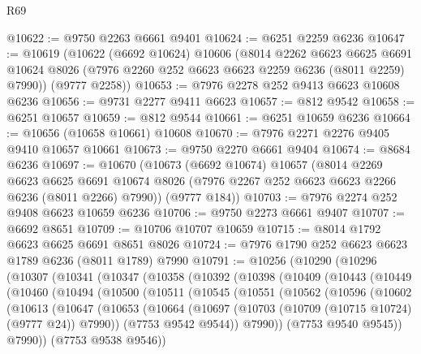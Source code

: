 \begin{lexlean}{R69}
\begin{coremodule}
{@10622 := @9750 @2263 @6661 @9401
@10624 := @6251 @2259 @6236
@10647 := @10619
    (@10622
      (@6692 @10624)
      @10606
      (@8014
        @2262
        @6623
        @6625
        @6691
        @10624
        @8026
        (@7976 @2260 @252 @6623 @6623 @2259 @6236 (@8011 @2259) @7990))
      (@9777 @2258))
@10653 := @7976 @2278 @252 @9413 @6623 @10608 @6236
@10656 := @9731 @2277 @9411 @6623
@10657 := @812 @9542
@10658 := @6251 @10657
@10659 := @812 @9544
@10661 := @6251 @10659 @6236
@10664 := @10656 (@10658 @10661) @10608
@10670 := @7976 @2271 @2276 @9405 @9410 @10657 @10661
@10673 := @9750 @2270 @6661 @9404
@10674 := @8684 @6236
@10697 := @10670
    (@10673
      (@6692 @10674)
      @10657
      (@8014
        @2269
        @6623
        @6625
        @6691
        @10674
        @8026
        (@7976 @2267 @252 @6623 @6623 @2266 @6236 (@8011 @2266) @7990))
      (@9777 @184))
@10703 := @7976 @2274 @252 @9408 @6623 @10659 @6236
@10706 := @9750 @2273 @6661 @9407
@10707 := @6692 @8651
@10709 := @10706 @10707 @10659
@10715 := @8014 @1792 @6623 @6625 @6691 @8651 @8026
@10724 := @7976 @1790 @252 @6623 @6623 @1789 @6236 (@8011 @1789) @7990
@10791 := @10256
    (@10290
      (@10296
        (@10307
          (@10341
            (@10347
              (@10358
                (@10392
                  (@10398
                    (@10409
                      (@10443
                        (@10449
                          (@10460
                            (@10494
                              (@10500
                                (@10511
                                  (@10545
                                    (@10551
                                      (@10562
                                        (@10596
                                          (@10602
                                            (@10613
                                              (@10647
                                                (@10653
                                                  (@10664
                                                    (@10697
                                                      (@10703
                                                        (@10709 (@10715 @10724) (@9777 @24))
                                                        @7990))
                                                    (@7753 @9542 @9544))
                                                  @7990))
                                              (@7753 @9540 @9545))
                                            @7990))
                                        (@7753 @9538 @9546))
}
\end{coremodule}
\end{lexlean}
